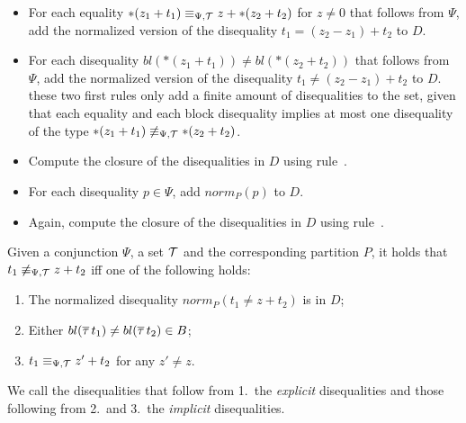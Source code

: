\begin{itemize}
    \item For each equality $*(z_1 + t_1) \equiv_{\Psi,\mathcal{T}} z + *(z_2 + t_2)$ for $z \neq 0$
    that follows from $\Psi$,
    add the normalized version of the disequality $t_1 = (z_2 - z_1) + t_2$ to $D$.
    \item For each disequality $bl(*(z_1 + t_1)) \neq bl(*(z_2 + t_2))$ that follows from $\Psi$, add the normalized version of the disequality $t_1 \neq (z_2 - z_1) + t_2$ to $D$.
    these two first rules only add a finite amount of disequalities to the set, given that each equality and each block disequality implies at most one disequality of the type $*(z_1 + t_1) \not\equiv_{\Psi,\mathcal{T}} *(z_2 + t_2)$.
    \item Compute the closure of the disequalities in $D$ using rule~.
    \item For each disequality $p \in \Psi$, add $norm_P(p)$ to $D$.
    \item Again, compute the closure of the disequalities in $D$ using rule~.
\end{itemize}

Given a conjunction $\Psi$, a set $\mathcal{T}$ and the corresponding partition $P$,
it holds that $t_1 \not\equiv_{\Psi,\mathcal{T}} z + t_2$ iff one of the following holds:

\begin{enumerate}
    \item The normalized disequality $norm_P(t_1 \neq z + t_2)$ is in $D$;
    \item Either $bl(\overline{\tau}\,t_1) \neq bl(\overline{\tau}\,t_2) \in B$;
    \item $t_1 \equiv_{\Psi,\mathcal{T}} z' + t_2$ for any $z' \neq z$.
\end{enumerate}
We call the disequalities that follow from 1.\ the \emph{explicit} disequalities and those following from 2.\ and 3.\ the \emph{implicit} disequalities.
